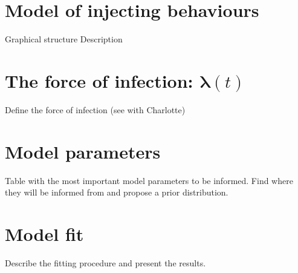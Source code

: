 \documentclass[11pt]{article}
\begin{document}
\section{\large{Model of injecting behaviours}}
Graphical structure
Description


\section{\large{The force of infection: $\boldsymbol{\lambda}(t)$}}
Define the force of infection (see with Charlotte)

\section{\large{Model parameters}}
Table with the most important model parameters to be informed. Find where they will be informed from and propose a prior distribution.

\section{\large{Model fit}}
Describe the fitting procedure and present the results.
\end{document}
